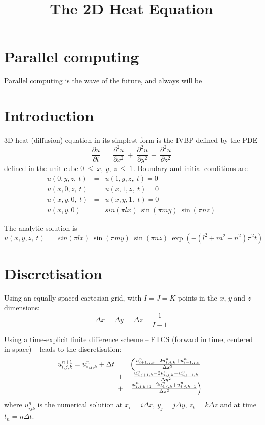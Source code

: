 \documentclass[12pt]{article}
\title{The 2D Heat Equation}
\def \fr {\frac}
\def \pd {\partial}
\begin{document}
\section{Parallel computing}

Parallel computing is the wave of the future, and always will be


\section{Introduction}

3D heat (diffusion) equation in its simplest form is the IVBP defined by the PDE
%
\[
  \fr{\pd u}{\pd t} \ =\ \fr{\pd^2 u}{\pd x^2} \ +\ \fr{\pd^2 u}{\pd y^2} \ +\ \fr{\pd^2 u}{\pd z^2}
\]
%
defined in the unit cube $0\ \leq\ x,~y,~z\ \leq\ 1$.  Boundary and initial conditions are
%
\begin{eqnarray*}
  u(0,y,z,~t) &=& u(1,y,z,~t) = 0 \\
  u(x,0,z,~t) &=& u(x,1,z,~t) = 0 \\
  u(x,y,0,~t) &=& u(x,y,1,~t) = 0 \\
  u(x,y,0) &=& sin(\pi l x)\ \sin(\pi m y)\ \sin(\pi n z)
\end{eqnarray*}

The analytic solution is
\[
  u(x,y,z,~t) \ =\ sin(\pi l x)\ \sin(\pi m y)\ \sin(\pi n z)\ \exp \left(-(l^2+m^2+n^2)\pi^2t \right)
\]


\section{Discretisation}

Using an equally spaced cartesian grid, with $I\!=\!J\!=\!K$ points in
the $x$, $y$ and $z$ dimensions:
%
\[
  \Delta x \!=\! \Delta y \!=\! \Delta z = \frac{1}{I-1}
\]

Using a time-explicit finite difference scheme -- FTCS (forward in
time, centered in space) -- leads to the discretisation:
%
\[
  u^{n+1}_{i,j,k} = u^n_{i,j,k} + \Delta t \begin{array}[t]{cc}
                                          & \left( \frac{u^n_{i+1,j,k}-2u^n_{i,j,k}+u^n_{i-1,j,k}}{\Delta x^2} \right. \\
                                        + & \frac{u^n_{i,j+1,k}-2u^n_{i,j,k}+u^n_{i,j-1,k}}{\Delta y^2} \\
                                        + & \left. \frac{u^n_{i,j,k+1}-2u^n_{i,j,k}+u^n_{i,j,k-1}}{\Delta z^2} \right)
                                      \end{array}
\]
%
where $u^n_{ijk}$ is the numerical solution at $x_i\!=\!i\Delta x$,
$y_j\!=\!j\Delta y$, $z_k\!=\!k\Delta z$ and at time $t_n\!=\!n\Delta
t$.
\end{document}
